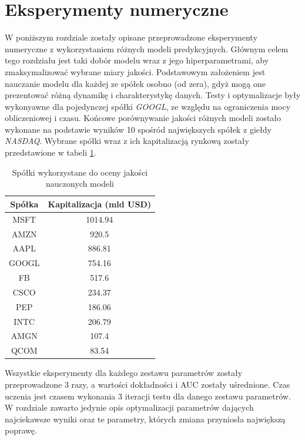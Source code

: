 \documentclass[a4paper, twoside, 11pt, openright]{article}
\begin{document}
\newpage

\section{Eksperymenty numeryczne}

W poniższym rozdziale zostały opisane przeprowadzone eksperymenty numeryczne z wykorzystaniem różnych modeli predykcyjnych. Głównym celem tego rozdziału jest taki dobór modelu wraz z jego hiperparametrami, aby zmaksymalizować wybrane miary jakości. Podstawowym założeniem jest nauczanie modelu dla każdej ze spółek osobno (od zera), gdyż mogą one prezentować różną dynamikę i charakterystykę danych. Testy i optymalizacje były wykonyawne dla pojedynczej spółki \textit{GOOGL}, ze względu na ograniczenia mocy obliczeniowej i czasu. Końcowe porównywanie jakości różnych modeli zostało wykonane na podstawie wyników 10 spośród największych spółek z giełdy \textit{NASDAQ}. Wybrane spółki wraz z ich kapitalizacją rynkową zostały przedstawione w tabeli \ref{tab:biggest_companies}.


\begin{table}[H]
    \centering
    \begin{tabular}{|c|c|}
    \hline
        \textbf{Spółka} & \textbf{Kapitalizacja (mld USD)} \\ \hline
        MSFT & 1014.94 \\ \hline 
        AMZN & 920.5 \\ \hline 
        AAPL & 886.81 \\ \hline 
        GOOGL & 754.16 \\ \hline 
        FB & 517.6 \\ \hline 
        CSCO & 234.37 \\ \hline 
        PEP & 186.06 \\ \hline 
        INTC & 206.79 \\ \hline 
        AMGN & 107.4 \\ \hline 
        QCOM & 83.54 \\ \hline 
    \end{tabular}
    \caption{Spółki wykorzystane do oceny jakości nauczonych modeli}
    \label{tab:biggest_companies}
\end{table}

Wszystkie eksperymenty dla każdego zestawu parametrów zostały przeprowadzone 3 razy, a wartości dokładności i AUC zostały uśrednione. Czas uczenia jest czasem wykonania 3 iteracji testu dla danego zestawu parametrów. W rozdziale zawarto jedynie opis optymalizacji parametrów dających najciekawsze wyniki oraz te parametry, których zmiana przyniosła największą poprawę.
\end{document}
